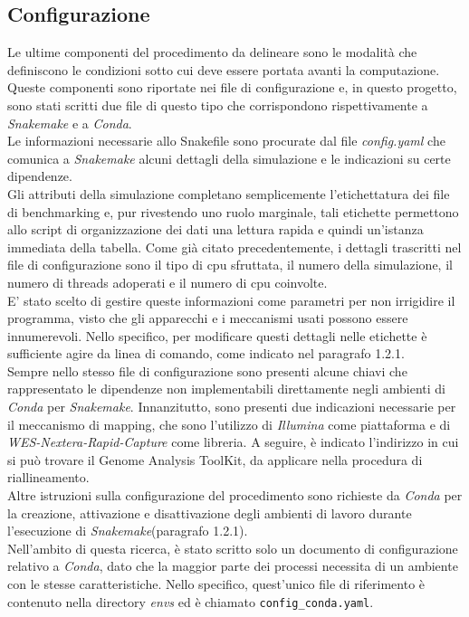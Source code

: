 \subsection{Configurazione}  
Le ultime componenti del procedimento da delineare sono le modalità che definiscono le condizioni sotto cui deve essere portata avanti la computazione. Queste componenti sono riportate nei file di configurazione e, in questo progetto, sono stati scritti due file di questo tipo che corrispondono rispettivamente a \textit{Snakemake} e a \textit{Conda}.\\
Le informazioni necessarie allo Snakefile sono procurate dal file \textit{config.yaml} che comunica a \textit{Snakemake} alcuni dettagli della simulazione e le indicazioni su certe dipendenze. \\
Gli attributi della simulazione completano semplicemente l'etichettatura dei file di benchmarking e, pur rivestendo uno ruolo marginale, tali etichette permettono allo script di organizzazione dei dati una lettura rapida e quindi un'istanza immediata della tabella. Come già citato precedentemente, i dettagli trascritti nel file di configurazione sono il tipo di cpu sfruttata, il numero della simulazione, il numero di threads adoperati e il numero di cpu coinvolte.\\
E' stato scelto di gestire queste informazioni come parametri per non irrigidire il programma, visto che gli apparecchi e i meccanismi usati possono essere innumerevoli. Nello specifico, per modificare questi dettagli nelle etichette è sufficiente agire da linea di comando, come indicato nel paragrafo 1.2.1.\\
Sempre nello stesso file di configurazione sono presenti alcune chiavi che rappresentato le dipendenze non implementabili direttamente negli ambienti di \textit{Conda} per \textit{Snakemake}. Innanzitutto, sono presenti due indicazioni necessarie per il meccanismo di mapping, che sono l'utilizzo di \textit{Illumina} come piattaforma e di \textit{WES-Nextera-Rapid-Capture} come libreria. A seguire, è indicato l'indirizzo in cui si può trovare il Genome Analysis ToolKit, da applicare nella procedura di riallineamento.\\
Altre istruzioni sulla configurazione del procedimento sono richieste da \textit{Conda} per la creazione, attivazione e disattivazione degli ambienti di lavoro durante l'esecuzione di \textit{Snakemake}(paragrafo 1.2.1).\\           
Nell'ambito di questa ricerca, è stato scritto solo un documento di configurazione relativo a \textit{Conda}, dato che la maggior parte dei processi necessita di un ambiente con le stesse caratteristiche. Nello specifico, quest'unico file di riferimento è contenuto nella directory \textit{envs} ed è chiamato \verb!config_conda.yaml!.\\ 

